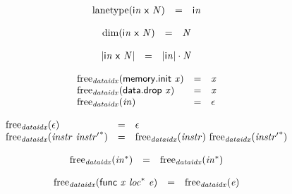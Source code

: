 $$
\begin{array}{@{}lcl@{}l@{}}
{\mathrm{lanetype}}({\mathsf{i}}{{\mathit{n}}}~\mathsf{x}~{\mathit{N}}) &=& {\mathsf{i}}{{\mathit{n}}} &  \\
\end{array}
$$

$$
\begin{array}{@{}lcl@{}l@{}}
{\mathrm{dim}}({\mathsf{i}}{{\mathit{n}}}~\mathsf{x}~{\mathit{N}}) &=& {\mathit{N}} &  \\
\end{array}
$$

$$
\begin{array}{@{}lcl@{}l@{}}
{|{\mathsf{i}}{{\mathit{n}}}~\mathsf{x}~{\mathit{N}}|} &=& {|{\mathsf{i}}{{\mathit{n}}}|} \cdot {\mathit{N}} &  \\
\end{array}
$$

\vspace{1ex}

\vspace{1ex}

$$
\begin{array}{@{}lcl@{}l@{}}
{\mathrm{free}}_{{\mathit{dataidx}}}(\mathsf{memory.init}~{\mathit{x}}) &=& {\mathit{x}} &  \\
{\mathrm{free}}_{{\mathit{dataidx}}}(\mathsf{data.drop}~{\mathit{x}}) &=& {\mathit{x}} &  \\
{\mathrm{free}}_{{\mathit{dataidx}}}({\mathit{in}}) &=& \epsilon &  \\
\end{array}
$$

$$
\begin{array}{@{}lcl@{}l@{}}
{\mathrm{free}}_{{\mathit{dataidx}}}(\epsilon) &=& \epsilon &  \\
{\mathrm{free}}_{{\mathit{dataidx}}}({\mathit{instr}}~{{\mathit{instr}'}^\ast}) &=& {\mathrm{free}}_{{\mathit{dataidx}}}({\mathit{instr}})~{\mathrm{free}}_{{\mathit{dataidx}}}({{\mathit{instr}'}^\ast}) &  \\
\end{array}
$$

$$
\begin{array}{@{}lcl@{}l@{}}
{\mathrm{free}}_{{\mathit{dataidx}}}({{\mathit{in}}^\ast}) &=& {\mathrm{free}}_{{\mathit{dataidx}}}({{\mathit{in}}^\ast}) &  \\
\end{array}
$$

$$
\begin{array}{@{}lcl@{}l@{}}
{\mathrm{free}}_{{\mathit{dataidx}}}(\mathsf{func}~{\mathit{x}}~{{\mathit{loc}}^\ast}~{\mathit{e}}) &=& {\mathrm{free}}_{{\mathit{dataidx}}}({\mathit{e}}) &  \\
\end{array}
$$

